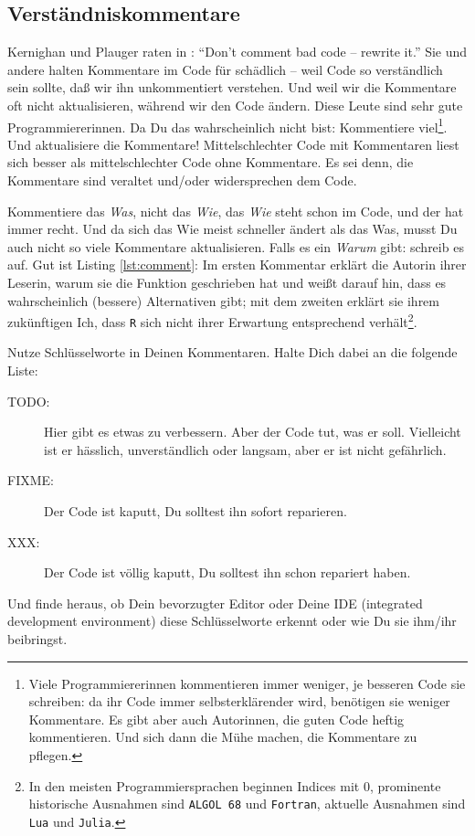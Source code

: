 \documentclass[twoside]{scrreprt}
\providecommand{\R}{\texttt{R}}
\begin{document}
\subsection{Verst\"a{}ndniskommentare\label{sec:compcom}}
Kernighan und Plauger raten in \cite{KP}:
"`Don't comment bad code -- rewrite it."'
Sie und andere halten Kommentare im Code f\"u{}r sch\"a{}dlich  --
weil Code so verst\"a{}ndlich sein sollte, da\ss{} wir ihn unkommentiert
verstehen.
Und weil wir die Kommentare oft nicht aktualisieren, w\"a{}hrend wir den Code
\"a{}ndern.
Diese Leute sind sehr gute Programmiererinnen.
Da Du das wahrscheinlich nicht bist:
Kommentiere viel\footnote{Viele Programmiererinnen kommentieren immer weniger,
    je besseren Code sie schreiben: da ihr Code immer selbsterkl\"a{}render
    wird, ben\"o{}tigen sie weniger Kommentare. Es gibt aber auch Autorinnen,
    die guten Code heftig kommentieren. Und sich dann die M\"u{}he machen, die
    Kommentare zu pflegen.
}.
Und aktualisiere die Kommentare!
Mittelschlechter Code mit Kommentaren liest sich besser als mittelschlechter 
Code ohne Kommentare. Es sei denn, die Kommentare sind veraltet und/oder
widersprechen dem Code.

Kommentiere das \emph{Was}, nicht das \emph{Wie}, das \emph{Wie} steht schon im
Code, und der hat immer recht.
Und da sich das Wie meist schneller \"a{}ndert als das Was, musst Du auch
nicht so viele Kommentare aktualisieren.
Falls es ein \emph{Warum} gibt: schreib es auf.
Gut ist  Listing \ref{lst:comment}: Im ersten Kommentar erkl\"a{}rt die Autorin
ihrer Leserin, warum sie die Funktion geschrieben hat und wei\ss{}t darauf hin,
dass es wahrscheinlich (bessere) Alternativen gibt; mit dem zweiten
erkl\"a{}rt sie ihrem zuk\"u{}nftigen Ich, dass \R{} sich nicht ihrer Erwartung
entsprechend verh\"a{}lt\footnote{In den meisten Programmiersprachen beginnen
    Indices mit 0, prominente historische Ausnahmen sind \texttt{ALGOL 68} und
    \texttt{Fortran}, aktuelle Ausnahmen sind \texttt{Lua} und \texttt{Julia}.}.


Nutze Schl\"u{}sselworte in Deinen Kommentaren. Halte Dich dabei an die folgende
Liste:
\begin{description}
\item[TODO:] Hier gibt es etwas zu verbessern. Aber der Code tut, was er soll.
  Vielleicht ist er h\"a{}sslich, 
  unverst\"a{}ndlich oder langsam,
  aber er ist nicht gef\"a{}hrlich.
\item[FIXME:] Der Code ist kaputt, Du solltest ihn sofort reparieren.
\item[XXX:] Der Code ist v\"o{}llig kaputt, Du solltest ihn schon repariert
    haben.
\end{description}
Und finde heraus, ob Dein bevorzugter Editor oder Deine IDE (integrated
development environment) diese Schl\"u{}sselworte erkennt oder wie Du sie
ihm/ihr beibringst.
\end{document}
